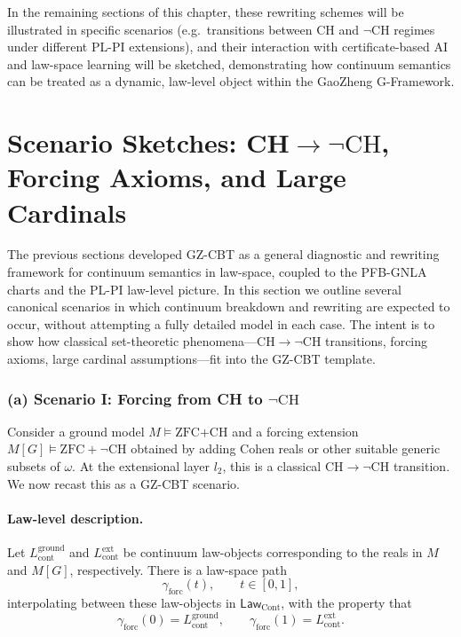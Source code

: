 \documentclass[11pt]{book}
\theoremstyle{plain}
\theoremstyle{definition}
\begin{document}
In the remaining sections of this chapter, these rewriting schemes will
be illustrated in specific scenarios (e.g.\ transitions between CH and
$\neg\mathrm{CH}$ regimes under different PL-PI extensions), and their
interaction with certificate-based AI and law-space learning will be
sketched, demonstrating how continuum semantics can be treated as a
dynamic, law-level object within the GaoZheng G-Framework.



\section[Scenario Sketches: CH → ¬CH, Forcing Axioms, and Large Cardinals]{Scenario Sketches: CH\texorpdfstring{$\to\neg\mathrm{CH}$}{ → ¬CH}, Forcing Axioms, and Large Cardinals}


The previous sections developed GZ-CBT as a general diagnostic and
rewriting framework for continuum semantics in law-space, coupled to
the PFB-GNLA charts and the PL-PI law-level picture. In this section we
outline several canonical scenarios in which continuum breakdown and
rewriting are expected to occur, without attempting a fully detailed
model in each case. The intent is to show how classical set-theoretic
phenomena---CH$\to\neg\mathrm{CH}$ transitions, forcing axioms,
large cardinal assumptions---fit into the GZ-CBT template.



\subsubsection*{(a) Scenario I: Forcing from CH to $\neg\mathrm{CH}$}

Consider a ground model $M\models\text{ZFC+CH}$ and a forcing
extension $M[G]\models\text{ZFC}+\neg\mathrm{CH}$ obtained by adding
Cohen reals or other suitable generic subsets of $\omega$. At the
extensional layer $l_2$, this is a classical CH$\to\neg\mathrm{CH}$
transition. We now recast this as a GZ-CBT scenario.

\paragraph{Law-level description.}

Let $L_{\mathrm{cont}}^{\mathrm{ground}}$ and
$L_{\mathrm{cont}}^{\mathrm{ext}}$ be continuum law-objects
corresponding to the reals in $M$ and $M[G]$, respectively. There is a
law-space path
\[
  \gamma_{\mathrm{forc}}(t),
  \qquad
  t\in[0,1],
\]
interpolating between these law-objects in $\mathsf{Law}_{\mathrm{Cont}}$,
with the property that
\[
  \gamma_{\mathrm{forc}}(0)
    = L_{\mathrm{cont}}^{\mathrm{ground}},
  \qquad
  \gamma_{\mathrm{forc}}(1)
    = L_{\mathrm{cont}}^{\mathrm{ext}}.
\]
\end{document}
